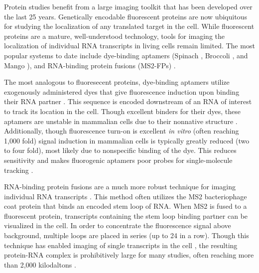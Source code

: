 Protein studies benefit from a large imaging toolkit that has been developed over the last 25 years. Genetically encodable fluorescent proteins are now ubiquitous for studying the localization of any translated target in the cell. While fluorescent proteins are a mature, well-understood technology, tools for imaging the localization of individual RNA transcripts in living cells remain limited. The most popular systems to date include dye-binding aptamers (Spinach \cite{PaigeRNAMimicsGreen2011}, Broccoli \cite{FilonovBroccoliRapidSelection2014}, and Mango \cite{AutourFluorogenicRNAMango2018,DolgosheinaRNAMangoAptamerFluorophore2014}), and RNA-binding protein fusions (MS2-FPs) \cite{FuscoSinglemRNAMolecules2003,TutucciimprovedMS2system2018}.

The most analogous to fluoresecent proteins, dye-binding aptamers utilize exogenously administered dyes that give fluorescence induction upon binding their RNA partner  \cite{PaigeRNAMimicsGreen2011,FilonovBroccoliRapidSelection2014,AutourFluorogenicRNAMango2018,DolgosheinaRNAMangoAptamerFluorophore2014,BabendureAptamersSwitchFluorescence2003,ConstantinSynthesisNewFluorogenic2008}.
This sequence is encoded downstream of an RNA of interest to track its location in the cell. Though excellent binders for their dyes, these aptamers are unstable in mammalian cells due to their nonnative structure \cite{EtzelSyntheticRiboswitchesPlug2017,IiiStructuralbasishighaffinity2017,WarnerStructuralbasisactivity2014,JengFluorophoreligandbinding2016}.
Additionally, though fluorescence turn-on is excellent \textit{in vitro} (often reaching 1,000 fold) signal induction in mammalian cells is typically greatly reduced (two to four fold), most likely due to nonspecific binding of the dye. This reduces sensitivity and makes fluorogenic aptamers poor probes for single-molecule tracking \cite{AutourFluorogenicRNAMango2018}.

RNA-binding protein fusions are a much more robust technique for imaging individual RNA transcripts  \cite{FuscoSinglemRNAMolecules2003}. This method often utilizes the MS2 bacteriophage coat protein that binds an encoded stem loop of RNA. When MS2 is fused to a fluorescent protein, transcripts containing the stem loop binding partner can be visualized in the cell. In order to concentrate the fluorescence signal above background, multiple loops are placed in series (up to 24 in a row). Though this technique has enabled imaging of single transcripts in the cell  \cite{MorisakiRealtimequantificationsingle2016,FuscoSinglemRNAMolecules2003}, the resulting protein-RNA complex is prohibitively large for many studies, often reaching more than 2,000 kilodaltons \cite{TutucciimprovedMS2system2018}.

